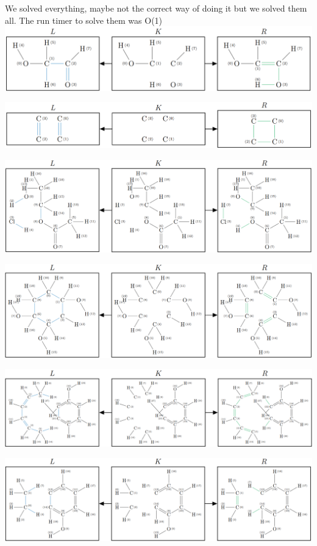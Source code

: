\documentclass[a4paper,10pt,titlepage]{report}
\begin{document}
We solved everything, maybe not the correct way of doing it but we solved them all. The run timer to solve them was O(1) \newline
\includegraphics[scale=0.2]{a2_1.png}

\includegraphics[scale=0.2]{a2_2.png}

\includegraphics[scale=0.2]{a2_3.png}

\includegraphics[scale=0.2]{a2_4.png}

\includegraphics[scale=0.2]{a2_5.png}

\includegraphics[scale=0.2]{a2_6.png}
\end{document}
